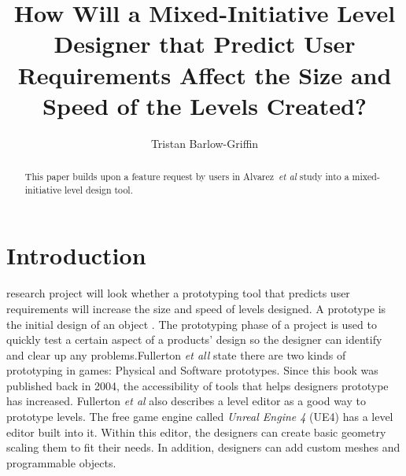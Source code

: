 \documentclass[journal]{IEEEtran}
\begin{document}
%
\title{ How Will a Mixed-Initiative Level Designer that Predict User Requirements Affect the Size and Speed of the Levels Created?}
%
%

\author{Tristan Barlow-Griffin}


\maketitle

\begin{abstract}
This paper builds upon a feature request by users in Alvarez~\textit{et al}\cite{alvarez2018fostering} study into a mixed-initiative level design tool. 
\end{abstract}





\section{Introduction} \label{intro}
 research project will look whether a prototyping tool that predicts user requirements will increase the size and speed of levels designed. A prototype is the initial design of an object \cite{prototype}. The prototyping phase of a project is used to quickly test a certain aspect of a products' design so the designer can identify and clear up any problems\cite{budde1992prototyping}.Fullerton \textit{et all} \cite[p.~150]{fullerton2004game} state there are two kinds of prototyping in games: Physical and Software prototypes. Since this book was published back in 2004, the accessibility of tools that helps designers prototype has increased. Fullerton \textit{et al} \cite[p.~164]{fullerton2004game} also describes a level editor as a good way to prototype levels.  The free game engine called \textit{Unreal Engine 4} (UE4) has a level editor built into it. Within this editor, the designers can create basic geometry scaling them to fit their needs. In addition, designers can add custom meshes and programmable objects.
\end{document}
